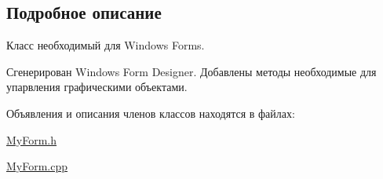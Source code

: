 \subsection{Подробное описание}
Класс необходимый для Windows Forms. 

Сгенерирован Windows Form Designer. Добавлены методы необходимые для упарвления графическими объектами. 

Объявления и описания членов классов находятся в файлах\+:\begin{DoxyCompactItemize}
\item 
\mbox{\hyperlink{_my_form_8h}{My\+Form.\+h}}\item 
\mbox{\hyperlink{_my_form_8cpp}{My\+Form.\+cpp}}\end{DoxyCompactItemize}
